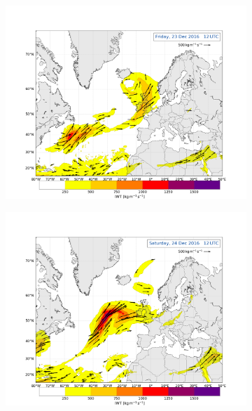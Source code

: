 \begin{figure}[t!]%
	\begin{subfigure}[b]{0.49\textwidth}
		\includegraphics[trim={4.2cm 3.9cm 4.3cm 5.1cm},clip,
		width=\textwidth]{./fig_Atm_Riv/20161223_12}
		\caption{}\label{fig:AR23}
	\end{subfigure}
	\begin{subfigure}[b]{0.49\textwidth}
		\includegraphics[trim={4.2cm 3.9cm 4.3cm 5.1cm},clip,
		width=\textwidth]{./fig_Atm_Riv/20161224_12}
		\caption{}\label{fig:AR24}
	\end{subfigure}

\end{figure}
